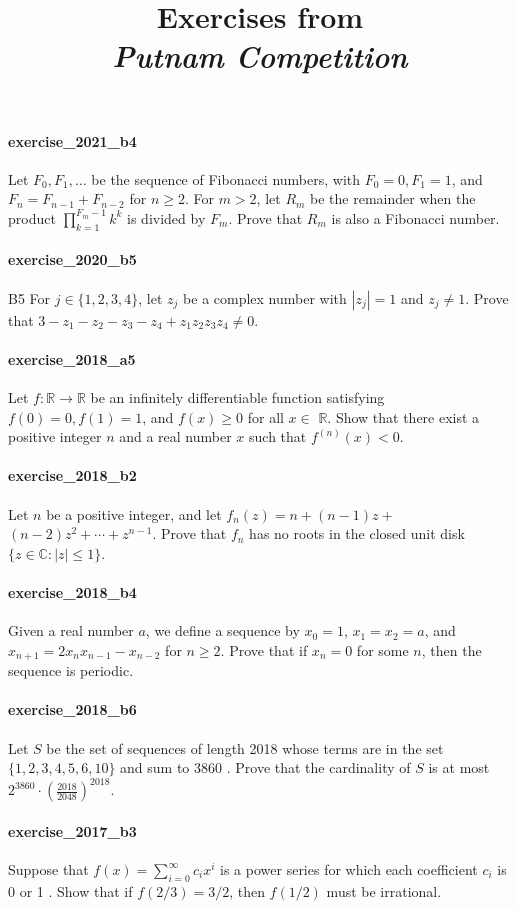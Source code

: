 \documentclass{article}
\title{\textbf{
Exercises from \\
\textit{Putnam Competition} \\
}}
\date{}
\begin{document}
\maketitle

\paragraph{exercise\_2021\_b4} Let $F_{0}, F_{1}, \ldots$ be the sequence of Fibonacci numbers, with $F_{0}=0, F_{1}=1$, and $F_{n}=F_{n-1}+F_{n-2}$ for $n \geq 2$. For $m>2$, let $R_{m}$ be the remainder when the product $\prod_{k=1}^{F_{m}-1} k^{k}$ is divided by $F_{m}$. Prove that $R_{m}$ is also a Fibonacci number.

\paragraph{exercise\_2020\_b5} B5 For $j \in\{1,2,3,4\}$, let $z_{j}$ be a complex number with $\left|z_{j}\right|=1$ and $z_{j} \neq 1$. Prove that $3-z_{1}-z_{2}-z_{3}-z_{4}+z_{1} z_{2} z_{3} z_{4} \neq 0 .$

\paragraph{exercise\_2018\_a5} Let $f: \mathbb{R} \rightarrow \mathbb{R}$ be an infinitely differentiable function satisfying $f(0)=0, f(1)=1$, and $f(x) \geq 0$ for all $x \in$ $\mathbb{R}$. Show that there exist a positive integer $n$ and a real number $x$ such that $f^{(n)}(x)<0$.

\paragraph{exercise\_2018\_b2} Let $n$ be a positive integer, and let $f_{n}(z)=n+(n-1) z+$ $(n-2) z^{2}+\cdots+z^{n-1}$. Prove that $f_{n}$ has no roots in the closed unit disk $\{z \in \mathbb{C}:|z| \leq 1\}$.

\paragraph{exercise\_2018\_b4} Given a real number $a$, we define a sequence by $x_{0}=1$, $x_{1}=x_{2}=a$, and $x_{n+1}=2 x_{n} x_{n-1}-x_{n-2}$ for $n \geq 2$. Prove that if $x_{n}=0$ for some $n$, then the sequence is periodic.

\paragraph{exercise\_2018\_b6} Let $S$ be the set of sequences of length 2018 whose terms are in the set $\{1,2,3,4,5,6,10\}$ and sum to 3860 . Prove that the cardinality of $S$ is at most $2^{3860} \cdot\left(\frac{2018}{2048}\right)^{2018} .$

\paragraph{exercise\_2017\_b3} Suppose that $f(x)=\sum_{i=0}^{\infty} c_{i} x^{i}$ is a power series for which each coefficient $c_{i}$ is 0 or 1 . Show that if $f(2 / 3)=3 / 2$, then $f(1 / 2)$ must be irrational.
\end{document}
